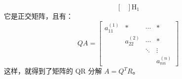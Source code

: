 \begin{itemize}
\begin{equation*}
\begin{bmatrix}
              \end{bmatrix}\mathrm{H_{1}}
          \end{equation*}
          它是正交矩阵，且有：
          \begin{equation*}
              QA=\begin{bmatrix}
                  a_{11}^{(1)} & *            & \cdots       & *      \\
                               & a_{22}^{(2)} & \cdots       & *      \\
                               &              & \ddots       & \vdots \\
                               &
                               &              & a_{nn}^{(n)}
              \end{bmatrix}
          \end{equation*}
          这样，就得到了矩阵的 QR 分解 $A=Q^TR$。
\end{itemize}

